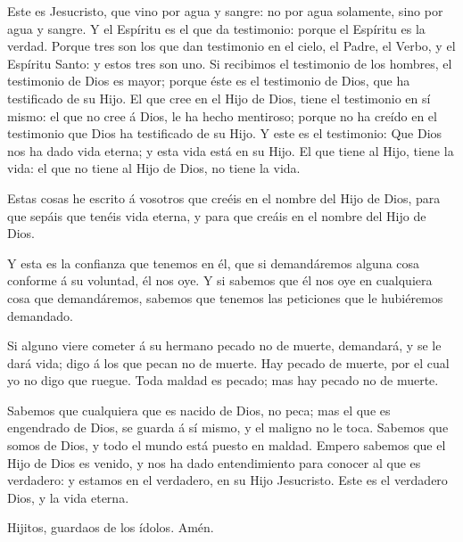  Este es Jesucristo, que vino por agua y sangre: no por agua
solamente, sino por agua y sangre. Y el Espíritu es el que da
testimonio: porque el Espíritu es la verdad.  Porque tres
son los que dan testimonio en el cielo,  el Padre, el Verbo,
y el Espíritu Santo: y estos tres son uno.  Si recibimos el
testimonio de los hombres, el testimonio de Dios es mayor; porque éste
es el testimonio de Dios, que ha testificado de su Hijo. 
El que cree en el Hijo de Dios, tiene el testimonio en sí mismo: el que
no cree á Dios, le ha hecho mentiroso; porque no ha creído en el
testimonio que Dios ha testificado de su Hijo.  Y este es
el testimonio: Que Dios nos ha dado vida eterna; y esta vida está en su
Hijo.  El que tiene al Hijo, tiene la vida: el que no tiene
al Hijo de Dios, no tiene la vida.

 Estas cosas he escrito á vosotros que creéis en el nombre
del Hijo de Dios, para que sepáis que tenéis vida eterna, y para que
creáis en el nombre del Hijo de Dios.

 Y esta es la confianza que tenemos en él, que si
demandáremos alguna cosa conforme á su voluntad, él nos oye.
 Y si sabemos que él nos oye en cualquiera cosa que
demandáremos, sabemos que tenemos las peticiones que le hubiéremos
demandado.

 Si alguno viere cometer á su hermano pecado no de muerte,
demandará, y se le dará vida; digo á los que pecan no de muerte. Hay
pecado de muerte, por el cual yo no digo que ruegue.  Toda
maldad es pecado; mas hay pecado no de muerte.

 Sabemos que cualquiera que es nacido de Dios, no peca; mas
el que es engendrado de Dios, se guarda á sí mismo, y el maligno no le
toca.  Sabemos que somos de Dios, y todo el mundo está
puesto en maldad.  Empero sabemos que el Hijo de Dios es
venido, y nos ha dado entendimiento para conocer al que es verdadero: y
estamos en el verdadero, en su Hijo Jesucristo. Este es el verdadero
Dios, y la vida eterna.

 Hijitos, guardaos de los ídolos. Amén.
